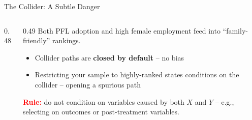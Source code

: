 \begin{frame}{The Collider: A Subtle Danger}
  \small
  \begin{columns}[T]
    \begin{column}{0.48\textwidth}
      \centering
      \vspace{6pt}
    \end{column}
    \begin{column}{0.49\textwidth}
      \footnotesize
      Both PFL adoption and high female employment feed into ``family-friendly'' rankings.

      \vspace{4pt}

      \begin{itemize}
        \item Collider paths are \textbf{closed by default} -- no bias
        \item Restricting your sample to highly-ranked states conditions on the collider -- opening a spurious path
      \end{itemize}

      \vspace{4pt}

      \textbf{\textcolor{red}{Rule:}} do not condition on variables caused by both $X$ and $Y$ -- e.g., selecting on outcomes or post-treatment variables.
    \end{column}
  \end{columns}
\end{frame}


